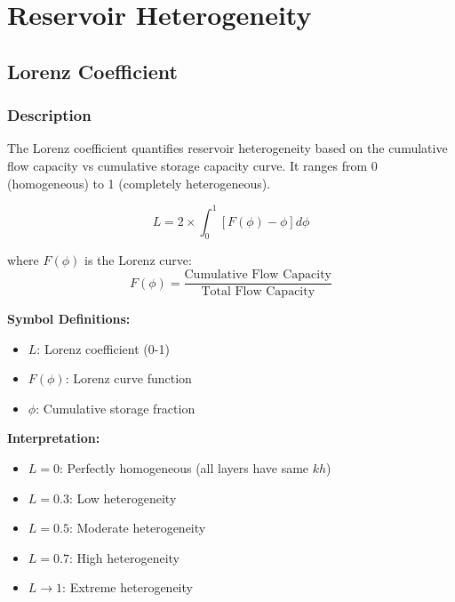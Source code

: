 \documentclass[11pt,a4paper]{article}
\newcommand{\symitem}[2]{\item \textbf{#1}: #2}
\begin{document}
\newpage

\section{Reservoir Heterogeneity}

\subsection{Lorenz Coefficient}

\subsubsection{Description}
The Lorenz coefficient quantifies reservoir heterogeneity based on the cumulative flow capacity vs cumulative storage capacity curve. It ranges from 0 (homogeneous) to 1 (completely heterogeneous).

\begin{tcolorbox}[colback=formulabox,colframe=black!75]
\begin{equation}
L = 2 \times \int_0^1 [F(\phi) - \phi] d\phi
\end{equation}

where $F(\phi)$ is the Lorenz curve:
\begin{equation}
F(\phi) = \frac{\text{Cumulative Flow Capacity}}{\text{Total Flow Capacity}}
\end{equation}
\end{tcolorbox}

\textbf{Symbol Definitions:}
\begin{itemize}[leftmargin=2cm]
\symitem{$L$}{Lorenz coefficient (0-1)}
\symitem{$F(\phi)$}{Lorenz curve function}
\symitem{$\phi$}{Cumulative storage fraction}
\end{itemize}

\textbf{Interpretation:}
\begin{itemize}
\item $L = 0$: Perfectly homogeneous (all layers have same $k h$)
\item $L = 0.3$: Low heterogeneity
\item $L = 0.5$: Moderate heterogeneity
\item $L = 0.7$: High heterogeneity
\item $L \rightarrow 1$: Extreme heterogeneity
\end{itemize}
\end{document}
